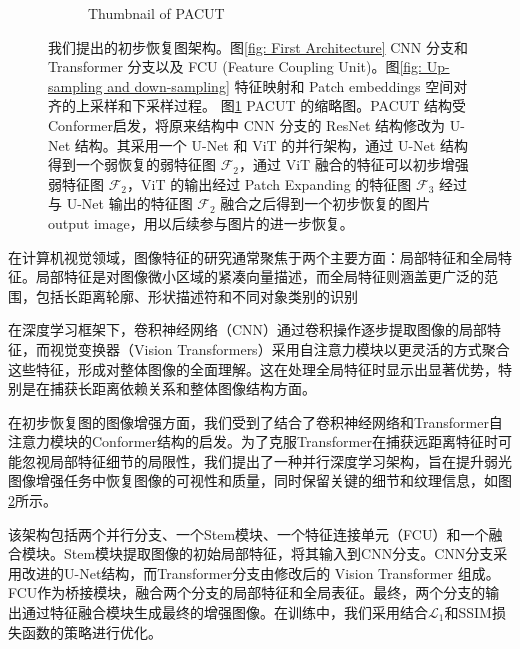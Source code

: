 \documentclass[a4paper]{ctexart}
\begin{document}
\begin{figure}[htb]
\begin{subfigure}{0.4\textwidth}
			\captionsetup{font=scriptsize}
			\caption{Thumbnail of PACUT}
			\label{fig: The proposed initial architecture(Abstract Picture)}	
		\end{subfigure}
		\caption{
			\label{fig: PACUT}
			我们提出的初步恢复图架构。图\ref{fig: First Architecture} CNN 分支和 Transformer 分支以及 FCU (Feature Coupling Unit)。图\ref{fig: Up-sampling and down-sampling} 特征映射和 Patch embeddings 空间对齐的上采样和下采样过程。 图\ref{fig: The proposed initial architecture(Abstract Picture)} PACUT 的缩略图。PACUT 结构受 Conformer\cite{peng2021conformer}启发，将原来结构中 CNN 分支的 ResNet 结构修改为 U-Net 结构。其采用一个 U-Net 和 ViT 的并行架构，通过 U-Net 结构得到一个弱恢复的弱特征图 $\mathcal{F}_2$，通过 ViT 融合的特征可以初步增强弱特征图 $\mathcal{F}_2$，ViT 的输出经过 Patch Expanding 的特征图 $\mathcal{F}_3$ 经过与 U-Net 输出的特征图 $\mathcal{F}_2$ 融合之后得到一个初步恢复的图片 output image，用以后续参与图片的进一步恢复。
		}
	\end{figure}
	\FloatBarrier
	
	在计算机视觉领域，图像特征的研究通常聚焦于两个主要方面：局部特征\cite{jain1991unsupervised, lowe2004distinctive, ojala2002multiresolution}和全局特征\cite{lisin2005combining}。局部特征是对图像微小区域的紧凑向量描述，而全局特征则涵盖更广泛的范围，包括长距离轮廓、形状描述符和不同对象类别的识别
	
	在深度学习框架下，卷积神经网络（CNN）通过卷积操作逐步提取图像的局部特征，而视觉变换器（Vision Transformers）采用自注意力模块以更灵活的方式聚合这些特征，形成对整体图像的全面理解。这在处理全局特征时显示出显著优势，特别是在捕获长距离依赖关系和整体图像结构方面。
	
	在初步恢复图的图像增强方面，我们受到了结合了卷积神经网络和Transformer自注意力模块的Conformer\cite{peng2021conformer}结构的启发。为了克服Transformer在捕获远距离特征时可能忽视局部特征细节的局限性，我们提出了一种并行深度学习架构，旨在提升弱光图像增强任务中恢复图像的可视性和质量，同时保留关键的细节和纹理\cite{karu1996there}信息，如图\ref{fig: PACUT}所示。
	
	该架构包括两个并行分支、一个Stem模块、一个特征连接单元（FCU）和一个融合模块。Stem模块\cite{szegedy2016rethinking}提取图像的初始局部特征，将其输入到CNN分支。CNN分支采用改进的U-Net结构，而Transformer分支由修改后的 Vision Transformer 组成。FCU作为桥接模块，融合两个分支的局部特征和全局表征。最终，两个分支的输出通过特征融合模块生成最终的增强图像。在训练中，我们采用结合$\mathcal{L}_1$和SSIM损失函数的策略进行优化。
	
\end{document}
